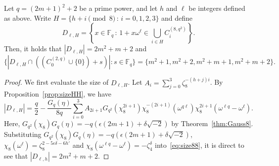 \documentclass[ALCO,ThmDefs,Unicode]{cedram}
\newcommand*\F{{\mathbb F}}
\begin{document}
\begin{theo}\label{thm:twoint}
Let $q=(2m+1)^2+2$ be a prime power, and let $h$ and $\ell$ be integers defined as above. Write $H=\{h+i\pmod{8}\,:\,i=0,1,2,3\}$ and define
\[
D_{\ell,H}=\left\{x\in \F_q\,:\, 1+x\omega^\ell\in \bigcup_{i\in H}C_{i}^{(8,q^2)}\right\}.
\]
Then, it holds that $|D_{\ell,H}|=2m^2+m+2$ and
\[
\{|D_{\ell,H}\cap ((C_0^{(2,q)}\cup \{0\})+s)|:s\in \F_q\}= \{m^2+1,m^2+2,m^2+m+1,m^2+m+2\}.
\]
\end{theo}

\begin{proof}
We first evaluate the size of $D_{\ell,H}$. Let $A_i=\sum_{j=0}^3\zeta_8^{-(h+j)i}$. By Proposition~\ref{prop:sizeHH}, we have
\begin{equation}\label{eq:size88}
|D_{\ell,H}|=\frac{q}{2}-\frac{G_q(\eta)}{8q}\sum_{i=0}^{3} A_{2i+1} G_{q^2}(\chi_8^{2i+1})\chi_8^{-(2i+1)}(\omega^{q\ell})\chi_8^{2i+1}(\omega^{\ell q}-\omega^{\ell}).
\end{equation}
Here, $G_{q^2}(\chi_8)G_q(\eta)=-q(\epsilon (2m+1)+\delta \sqrt{-2})$ by Theorem~\ref{thm:Gauss8}. Substituting $G_{q^2}(\chi_8)G_q(\eta)=-q(\epsilon (2m+1)+\delta \sqrt{-2})$, $\chi_8(\omega^\ell)=\zeta_8^{2-5\epsilon \delta-6h'}$ and $\chi_8(\omega^{\ell q}-\omega^\ell)=-\zeta_4^{\delta}$ into~\eqref{eq:size88}, it is direct to see that $|D_{\ell,h}|=2m^2+m+2$.


\end{proof}
\end{document}
